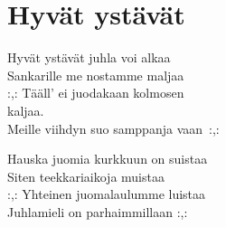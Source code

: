 \section{Hyvät ystävät}
Hyvät ystävät juhla voi alkaa\\
Sankarille me nostamme maljaa\\
:,: Tääll’ ei juodakaan kolmosen \\
kaljaa.\\
Meille viihdyn suo samppanja vaan~:,: 

Hauska juomia kurkkuun on suistaa\\
Siten teekkariaikoja muistaa\\
:,: Yhteinen juomalaulumme luistaa \\
Juhlamieli on parhaimmillaan :,:
